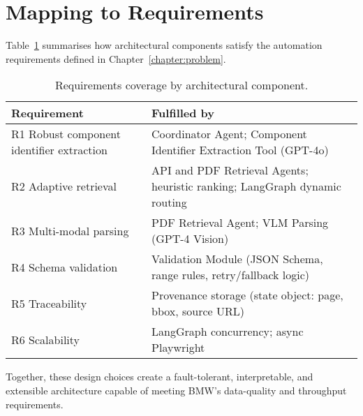 \section{Mapping to Requirements}
Table~\ref{tab:reqmap} summarises how architectural components satisfy the automation requirements defined in Chapter~\ref{chapter:problem}.

\begin{table}[ht]
  \centering
  \caption{Requirements coverage by architectural component.}
  \label{tab:reqmap}
  \begin{tabular}{p{3.7cm} p{8.8cm}}
    \hline
    \textbf{Requirement} & \textbf{Fulfilled by} \\\hline
    R1 Robust component identifier extraction & Coordinator Agent; Component Identifier Extraction Tool (GPT-4o) \\
    R2 Adaptive retrieval & API and PDF Retrieval Agents; heuristic ranking; LangGraph dynamic routing \\
    R3 Multi-modal parsing & PDF Retrieval Agent; VLM Parsing (GPT-4 Vision) \\
    R4 Schema validation & Validation Module (JSON Schema, range rules, retry/fallback logic) \\
    R5 Traceability & Provenance storage (state object: page, bbox, source URL) \\
    R6 Scalability & LangGraph concurrency; async Playwright \\
    \hline
  \end{tabular}
\end{table}

Together, these design choices create a fault-tolerant, interpretable, and extensible architecture capable of meeting BMW's data-quality and throughput requirements.

